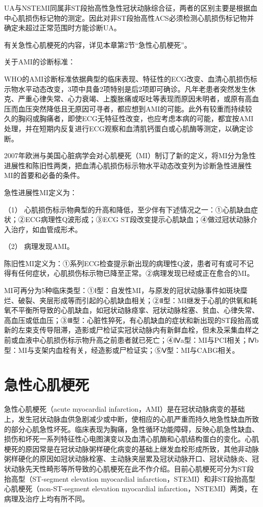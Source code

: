 UA与NSTEMI同属非ST段抬高性急性冠状动脉综合征，两者的区别主要是根据血中心肌损伤标记物的测定。因此对非ST段抬高性ACS必须检测心肌损伤标记物并确定未超过正常范围时方能诊断UA。

有关急性心肌梗死的内容，详见本章第2节“急性心肌梗死”。

关于AMI的诊断标准：

WHO的AMI诊断标准依据典型的临床表现、特征性的ECG改变、血清心肌损伤标示物水平动态改变，3项中具备2项特别是后2项即可确诊。凡年老患者突然发生休克、严重心律失常、心力衰竭、上腹胀痛或呕吐等表现而原因未明者，或原有高血压而血压突然降低且无原因可寻者，都应想到AMI的可能。此外有较重而持续较久的胸闷或胸痛者，即使ECG无特征性改变，也应考虑本病的可能，都宜按AMI处理，并在短期内反复进行ECG观察和血清肌钙蛋白或心肌酶等测定，以确定诊断。

2007年欧洲与美国心脏病学会对心肌梗死（MI）制订了新的定义，将MI分为急性进展性和陈旧性两类，把血清心肌损伤标示物水平动态改变列为诊断急性进展性MI的首要和必备的条件。

急性进展性MI定义为：

（1）
心肌损伤标示物典型的升高和降低，至少伴有下述情况之一：①心肌缺血症状；②ECG病理性Q波形成；③ECG
ST段改变提示心肌缺血；④做过冠状动脉介入治疗，如血管成形术。

（2） 病理发现AMI。

陈旧性MI定义为：①系列ECG检查提示新出现的病理性Q波，患者可有或可不记得有任何症状，心肌损伤标示物已降至正常。②病理发现已经或正在愈合的MI。

MI可再分为5种临床类型：①Ⅰ型：自发性MI，与原发的冠状动脉事件如斑块糜烂、破裂、夹层形成等而引起的心肌缺血相关；②Ⅱ型：MI继发于心肌的供氧和耗氧不平衡所导致的心肌缺血，如冠状动脉痉挛、冠状动脉栓塞、贫血、心律失常、高血压或低血压；③Ⅲ型：心脏性猝死，有心肌缺血的症状和新出现的ST段抬高或新的左束支传导阻滞，造影或尸检证实冠状动脉内有新鲜血栓，但未及采集血样之前或血液中心肌损伤标示物升高之前患者就已死亡；④Ⅳa型：MI与PCI相关；Ⅳb型：MI与支架内血栓有关，经造影或尸检证实；⑤Ⅴ型：MI与CABG相关。

\protect\hypertarget{text00312.html}{}{}

\section{急性心肌梗死}

急性心肌梗死（acute myocardial
infarction，AMI）是在冠状动脉病变的基础上，发生冠状动脉血供急剧减少或中断，使相应的心肌严重而持久地急性缺血所致的部分心肌急性坏死。临床表现为胸痛，急性循环功能障碍，反映心肌急性缺血、损伤和坏死一系列特征性心电图演变以及血清心肌酶和心肌结构蛋白的变化。心肌梗死的原因常是在冠状动脉粥样硬化病变的基础上继发血栓形成所致，其他非动脉粥样硬化的原因如冠状动脉栓塞、主动脉夹层累及冠状动脉开口、冠状动脉炎、冠状动脉先天性畸形等所导致的心肌梗死在此不作介绍。目前心肌梗死可分为ST段抬高型（ST-segment
elevation myocardial
infarction，STEMI）和非ST段抬高型心肌梗死（non-ST-segment elevation
myocardial infarction，NSTEMI）两类，在病理及治疗上均有所不同。

